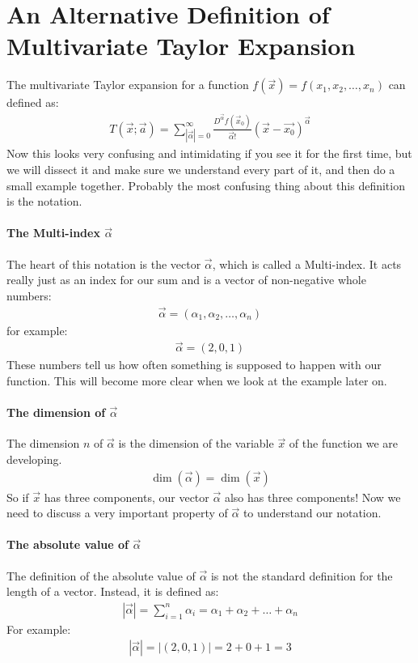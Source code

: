 \chapter{An Alternative Definition of Multivariate Taylor Expansion}\label{apx:multivariate_taylor}
The multivariate Taylor expansion for a function $f(\vec{x})=f(x_1,x_2, \dots, x_n)$ can defined as:
\begin{align}
	T(\vec{x};\vec{a}) = \sum^\infty_{|\vec{\alpha}|=0}\frac{D^{\Vec{\alpha}}f(\vec{x}_0)}{\vec{\alpha}!}\left(\vec{x}-\vec{x_0}\right)^{\vec{\alpha}}
\end{align}
Now this looks very confusing and intimidating if you see it for the first time, but we will dissect it and make sure we understand every part of it, and then do a small example together. Probably the most confusing thing about this definition is the notation. 

\subsubsection*{The Multi-index $\vec{\alpha}$}

The heart of this notation is the vector $\vec{\alpha}$, which is called a Multi-index. 
It acts really just as an index for our sum and is a vector of non-negative whole numbers:
\begin{align}
	\vec{\alpha} = (\alpha_1, \alpha_2, \dots,\alpha_n)
\end{align}
for example:
\begin{align}
	\vec{\alpha} = (2,0,1)
\end{align}
These numbers tell us how often something is supposed to happen with our function. This will become more clear when we look at the example later on. 

\subsubsection*{The dimension of $\vec{\alpha}$}
The dimension $n$ of $\vec{\alpha}$ is the dimension of the variable $\vec{x}$ of the function we are developing.
\begin{align}
	\dim(\vec{\alpha}) = \dim(\vec{x})
\end{align}
So if $\vec{x}$ has three components, our vector $\vec{\alpha}$ also has three components!
Now we need to discuss a very important property of $\vec{\alpha}$ to understand our notation. 

\subsubsection*{The absolute value of $\vec{\alpha}$}
The definition of the absolute value of $\vec{\alpha}$ is not the standard definition for the length of a vector. Instead, it is defined as:
\begin{align}
	|\vec{\alpha}| = \sum_{i=1}^n \alpha_i = \alpha_1+\alpha_2+\dots+\alpha_n
\end{align}
For example:
\begin{align}
	|\vec{\alpha}|=|(2,0,1)| = 2+0+1 = 3
\end{align}

